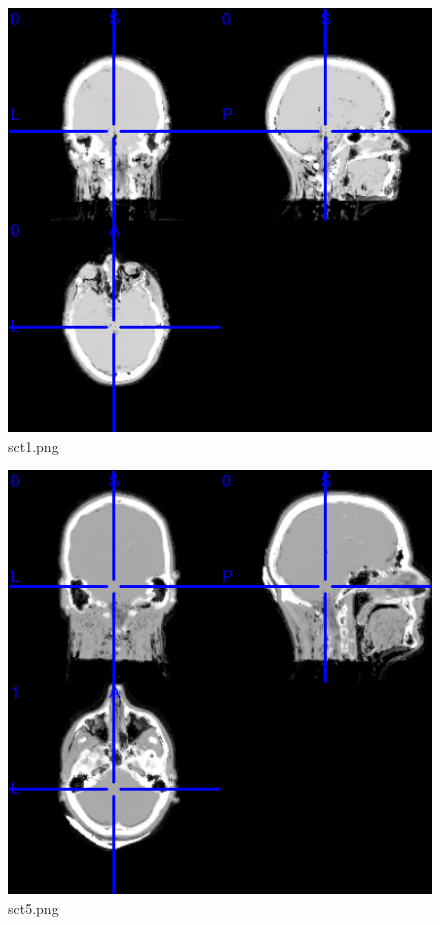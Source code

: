 \begin{figure}
\includegraphics[width=\linewidth]{sct1.png}
\caption{sct1.png}
\end{figure}

\begin{figure}
\includegraphics[width=\linewidth]{sct5.png}
\caption{sct5.png}
\end{figure}

